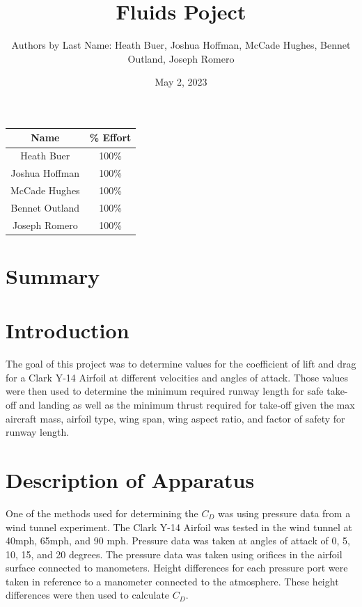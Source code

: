 \documentclass[
	12pt, %
]{refrigeration_report_style}
\title{Fluids Poject}        %
\author{Authors by Last Name: Heath Buer, Joshua Hoffman, McCade Hughes, Bennet Outland, Joseph Romero}   %
\date{May 2, 2023}%
\institute{Department of Mechanical Engineering}              %
\begin{document}
\maketitle 
\begin{table}
    \centering
    \begin{tabular}{c|c}
        Name & \% Effort \\
        \hline
        Heath Buer & 100\% \\
        Joshua Hoffman & 100\% \\
        McCade Hughes & 100\% \\
        Bennet Outland & 100\% \\
        Joseph Romero & 100\%
    \end{tabular}
\end{table}





\newpage
{}
\tableofcontents
\newpage
{}          %

\section{Summary}
\lipsum[1]

\section{Introduction}
The goal of this project was to determine values for the coefficient of lift and drag for a Clark Y-14 Airfoil at different velocities and angles of attack. Those values were then used to determine the minimum required runway length for safe take-off and landing as well as the minimum thrust required for take-off given the max aircraft mass, airfoil type, wing span, wing aspect ratio, and factor of safety for runway length. 

\section{Description of Apparatus}
One of the methods used for determining the $C_D$ was using pressure data from a wind tunnel experiment. The Clark Y-14 Airfoil was tested in the wind tunnel at 40mph, 65mph, and 90 mph. Pressure data was taken at angles of attack of 0, 5, 10, 15, and 20 degrees. The pressure data was taken using orifices in the airfoil surface connected to manometers. Height differences for each pressure port were taken in reference to a manometer connected to the atmosphere. These height differences were then used to calculate $C_D$. 
\end{document}

